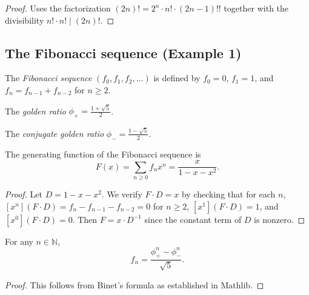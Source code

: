 \begin{proof}
\leanok
Uses the factorization $(2n)! = 2^n \cdot n! \cdot (2n-1)!!$ together with the
divisibility $n!\cdot n! \mid (2n)!$.
\end{proof}

\subsection{The Fibonacci sequence (Example 1)}

\begin{definition}
\label{def.fib.fibonacci}
\leanhelper
\leanok
The \emph{Fibonacci sequence} $(f_0, f_1, f_2, \ldots)$ is defined by
$f_0 = 0$, $f_1 = 1$, and $f_n = f_{n-1} + f_{n-2}$ for $n \geq 2$.
\end{definition}

\begin{definition}
\label{def.fib.golden_ratio_plus}
\leanhelper
\leanok
The \emph{golden ratio} $\phi_+ = \frac{1+\sqrt{5}}{2}$.
\end{definition}

\begin{definition}
\label{def.fib.golden_ratio_minus}
\leanhelper
\leanok
The \emph{conjugate golden ratio} $\phi_- = \frac{1-\sqrt{5}}{2}$.
\end{definition}

\begin{theorem}
\label{thm.fib.gf}
\leanhelper
\leanok
The generating function of the Fibonacci sequence is
\[
F(x) = \sum_{n\geq 0} f_n x^n = \frac{x}{1-x-x^2}.
\]
\end{theorem}

\begin{proof}
\leanok
Let $D = 1 - x - x^2$. We verify $F \cdot D = x$ by checking that for each $n$,
$[x^n](F\cdot D) = f_n - f_{n-1} - f_{n-2} = 0$ for $n \geq 2$,
$[x^1](F\cdot D) = 1$, and $[x^0](F\cdot D) = 0$.
Then $F = x \cdot D^{-1}$ since the constant term of $D$ is nonzero.
\end{proof}

\begin{theorem}
\label{thm.fib.binet}
\leanhelper
\leanok
For any $n\in\mathbb{N}$,
\[
f_n = \frac{\phi_+^n - \phi_-^n}{\sqrt{5}}.
\]
\end{theorem}

\begin{proof}
\leanok
This follows from Binet's formula as established in Mathlib.
\end{proof}

